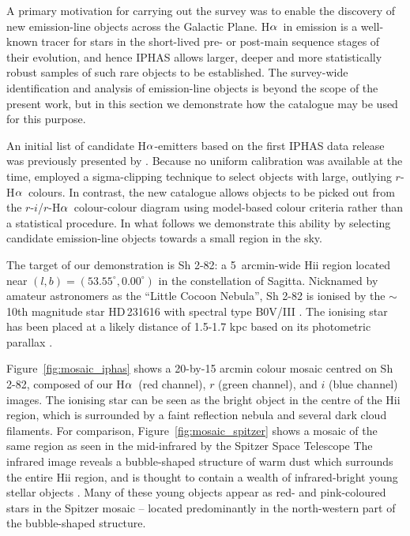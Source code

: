 \documentclass[useAMS,usenatbib]{mn2e}
\def\ha{\mbox{H$\rm \alpha$}}
\begin{document}
A primary motivation for carrying out the survey 
was to enable the discovery 
of new emission-line objects
across the Galactic Plane.
\ha\ in emission is a well-known tracer
for stars in the short-lived pre- or
post-main sequence stages of their evolution,
and hence IPHAS allows larger, deeper
and more statistically robust samples
of such rare objects to be established.
The survey-wide identification and analysis 
of emission-line objects is beyond the scope
of the present work,
but in this section we demonstrate how the
catalogue may be used for this purpose.

An initial list of candidate \ha-emitters
based on the first IPHAS data release was previously
presented by \cite{Witham2008}. 
Because no uniform calibration was available
at the time, \citeauthor{Witham2008} employed 
a sigma-clipping technique to select objects with
large, outlying $r$-\ha\ colours.
In contrast, the new catalogue
allows objects to be picked out
from the $r$-$i$/$r$-\ha\ colour-colour diagram
using model-based colour criteria
rather than a statistical procedure.
In what follows we demonstrate this ability 
by selecting candidate emission-line objects
towards a small region in the sky.

The target of our demonstration is Sh 2-82:
a 5~arcmin-wide H{\sc ii} region located near $(l,b)=(53.55^\circ, 0.00^\circ)$
in the constellation of Sagitta.
Nicknamed by amateur astronomers as the ``Little Cocoon Nebula'',
Sh 2-82 is ionised by 
the $\sim$10th magnitude star HD\,231616
with spectral type B0V/III
\citep{Georgelin1973,Mayer1973,Hunter1990}.
The ionising star has been placed 
at a likely distance of 1.5-1.7 kpc
based on its photometric parallax
\citep{Mayer1973,Lahulla1985,Hunter1990}.

Figure~\ref{fig:mosaic_iphas} shows a 20-by-15 arcmin
colour mosaic centred on Sh 2-82,
composed of our \ha\ (red channel),
$r$ (green channel),
and $i$ (blue channel) images.
The ionising star can be seen as the bright object
in the centre of the H{\sc ii} region,
which is surrounded by a faint reflection nebula
and several dark cloud filaments.
For comparison, Figure~\ref{fig:mosaic_spitzer} shows
a mosaic of the same region 
as seen in the mid-infrared by the Spitzer Space Telescope
The infrared image reveals a bubble-shaped structure
of warm dust which surrounds the entire H{\sc ii} region,
and is thought to contain a wealth of infrared-bright
young stellar objects \citep{Yu2012}.
Many of these young objects 
appear as red- and pink-coloured stars in the Spitzer mosaic --
located predominantly in the north-western part
of the bubble-shaped structure.
\end{document}
